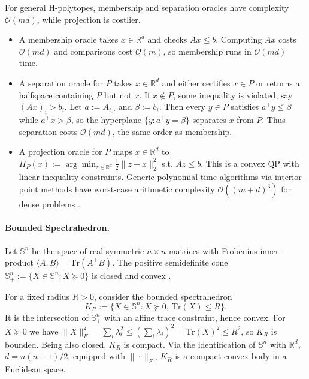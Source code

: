 \documentclass[11pt,letterpaper]{article}
\begin{document}
For general H-polytopes, membership and separation oracles have complexity $\mathcal{O}(md)$, while projection is costlier.

\begin{itemize}
  \item   A membership oracle takes $x\in\mathbb{R}^d$ and checks $Ax \le b$.
  Computing $Ax$ costs $\mathcal{O}(md)$ and comparisons cost $\mathcal{O}(m)$, so membership runs in $\mathcal{O}(md)$ time.

  \item   A separation oracle for $P$ takes $x\in\mathbb{R}^d$ and either certifies $x\in P$ or returns a halfspace containing $P$ but not $x$.
  If $x\notin P$, some inequality is violated, say $(Ax)_i > b_i$.
  Let $a := A_{i,\cdot}$ and $\beta := b_i$.
  Then every $y\in P$ satisfies $a^\top y \le \beta$ while $a^\top x > \beta$, so the hyperplane $\{y : a^\top y = \beta\}$ separates $x$ from $P$.
  Thus separation costs $\mathcal{O}(md)$, the same order as membership.

  \item   A projection oracle for $P$ maps $x\in\mathbb{R}^d$ to $ \Pi_P(x) := \arg\min_{z\in\mathbb{R}^d} \tfrac12\|z-x\|_2^2$ s.t. $Az\le b$. This is a convex QP with linear inequality constraints.
  Generic polynomial-time algorithms via interior-point methods have worst-case arithmetic complexity $\mathcal{O}((m+d)^3)$ for dense problems \cite{Nesterovnemir1994}.
\end{itemize}

\paragraph*{Bounded Spectrahedron.}

Let $\mathbb{S}^n$ be the space of real symmetric $n \times n$ matrices with Frobenius inner product $\langle A,B\rangle = \mathrm{Tr}(A^\top B)$.
The positive semidefinite cone $\mathbb{S}^n_+ := \{ X \in \mathbb{S}^n : X \succeq 0 \}$ is closed and convex \cite[Section~2.2.4]{Boyd2004}.

For a fixed radius $R>0$, consider the bounded spectrahedron
\[
  K_R := \{ X \in \mathbb{S}^n : X \succeq 0,\ \mathrm{Tr}(X) \le R \}.
\]
It is the intersection of $\mathbb{S}^n_+$ with an affine trace constraint, hence convex.
For $X \succeq 0$ we have $\|X\|_F^2 = \sum_i \lambda_i^2 \le (\sum_i \lambda_i)^2 = \mathrm{Tr}(X)^2 \le R^2$, so $K_R$ is bounded.
Being also closed, $K_R$ is compact.
Via the identification of $\mathbb{S}^n$ with $\mathbb{R}^d$, $d = n(n+1)/2$, equipped with $\|\cdot\|_F$, $K_R$ is a compact convex body in a Euclidean space.
\end{document}
